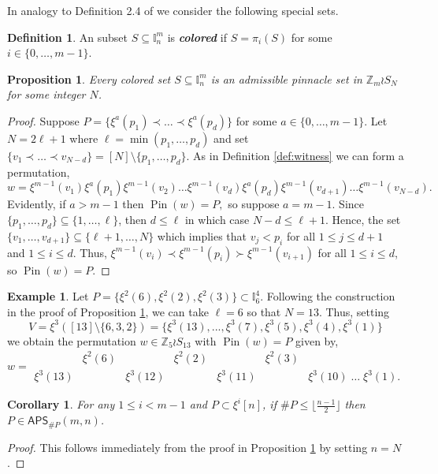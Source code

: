 \documentclass[12pt,reqno]{amsart}
\numberwithin{equation}{section}
\theoremstyle{plain}
\newtheorem{proposition}[theorem]{Proposition}
\newtheorem{corollary}[theorem]{Corollary}
\theoremstyle{definition}
\newtheorem{definition}[theorem]{Definition}
\newtheorem{example}[theorem]{Example}
\theoremstyle{remark}
\newcommand{\Z}{\mathbb{Z}}
\newcommand{\I}{\mathbb{I}}
\newcommand{\Pin}{\operatorname{Pin}}
\newcommand\APS{\mathsf{APS}}
\newcommand{\newword}[1]{\emph{\textbf{#1}}}
\begin{document}
In analogy to Definition 2.4 of \cite{PinSignedPermutations} we consider the following special sets.

\begin{definition}
   An subset $S \subseteq \I_n^m$ is \newword{colored} if $S = \pi_i(S)$ for some $i \in \{0,\dots,m-1\}$.
\end{definition}

\begin{proposition}\label{prop:colored}
    Every colored set $S \subseteq \I_n^m$ is an admissible pinnacle set in $\Z_m \wr S_N$ for some integer $N$. 
\end{proposition}

\begin{proof}
Suppose $P = \{ \xi^{a}(p_1) \prec \dots \prec \xi^{a}(p_d)\}$ for some $a\in \{0,\dots,m-1\}$. Let $N=2\ell+1$ where $\ell = \min(p_1,\dots,p_d)$ and set $\{v_1\prec \dots\prec v_{N-d}\}=[N]\setminus \{p_1,\dots,p_d\}$. As in Definition \ref{def:witness} we can form a permutation, 
\[
w = \xi^{m-1}(v_1) \xi^{a}(p_1) \xi^{m-1}(v_2) \dots \xi^{m-1}(v_d)\xi^{a}(p_d)\xi^{m-1}(v_{d+1}) \dots \xi^{m-1}(v_{N-d}).
\]
Evidently, if $a>m-1$ then $\Pin(w) = P,$ so suppose $a=m-1$. Since $\{ p_1,\dots,p_d\} \subseteq \{1,\dots,\ell\}$, then $d\leq \ell$ in which case $N-d\leq \ell+1$. Hence, the set $\{v_1,\dots,v_{d+1}\} \subseteq \{\ell+1,\dots,N\}$ which implies that $v_j<p_i$ for all $1\leq j \leq d+1$ and $1\leq i \leq d$. Thus, $\xi^{m-1}(v_i) \prec \xi^{m-1}(p_i) \succ \xi^{m-1}(v_{i+1})$ for all $1\leq i \leq d$, so $\Pin(w) = P$.
\end{proof}

\begin{example}
    Let $P = \{\xi^2 (6),\xi^2(2), \xi^2(3)  \} \subset \I^4_6$. Following the construction in the proof of Proposition \ref{prop:colored}, we can take $\ell = 6$ so that $N=13$. Thus, setting
    \[V = \xi^3( [13]\setminus \{6,3,2\})=\{\xi^3(13),..., \xi^3(7), \xi^3(5),\xi^3(4),\xi^3(1)\}\]
    we obtain the permutation $w \in \Z_5\wr S_{13}$ with $\Pin(w) = P$ given by, 
    \[w=
    \begin{matrix} 
    &\xi^2(6)&&\xi^2(2)&&\xi^2(3)&
\\
\xi^3(13)&&\xi^3(12)&&\xi^3(11)&&\xi^3(10)\; \dots \;\xi^3(1).
    \end{matrix}
    \]
\end{example}

\begin{corollary}\label{cor:signed}
For any $1\leq i < m-1$ and $P \subset \xi^i[n]$, if $\#P \leq \lfloor \frac{n-1}{2} \rfloor$ then $P \in \APS_{\#P}(m,n)$.
\end{corollary}
\begin{proof}
This follows immediately from the proof in Proposition \ref{prop:colored} by setting $n=N$.
\end{proof}
\end{document}
